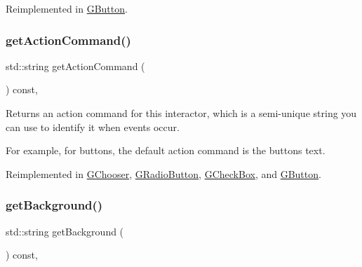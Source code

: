 Reimplemented in \mbox{\hyperlink{classGButton_a432ca43c59ffb2adc9cb66d43621bc27}{G\+Button}}.

\mbox{\label{classGInteractor_a94eb4276000c4fdfb508ce9e6317a82a}} 
\subsubsection{\texorpdfstring{get\+Action\+Command()}{getActionCommand()}}
{\footnotesize\ttfamily std\+::string get\+Action\+Command (\begin{DoxyParamCaption}{ }\end{DoxyParamCaption}) const\hspace{0.3cm}{\ttfamily [virtual]}, {\ttfamily [inherited]}}



Returns an action command for this interactor, which is a semi-\/unique string you can use to identify it when events occur. 

For example, for buttons, the default action command is the button\textquotesingle{}s text. 

Reimplemented in \mbox{\hyperlink{classGChooser_a90f2b1e6f6e7dabd9d6e5307f7c6d1b7}{G\+Chooser}}, \mbox{\hyperlink{classGRadioButton_a90f2b1e6f6e7dabd9d6e5307f7c6d1b7}{G\+Radio\+Button}}, \mbox{\hyperlink{classGCheckBox_a90f2b1e6f6e7dabd9d6e5307f7c6d1b7}{G\+Check\+Box}}, and \mbox{\hyperlink{classGButton_a90f2b1e6f6e7dabd9d6e5307f7c6d1b7}{G\+Button}}.

\mbox{\label{classGInteractor_a808e22cc1fdfbecf71ed8c64ef4600e0}} 
\subsubsection{\texorpdfstring{get\+Background()}{getBackground()}}
{\footnotesize\ttfamily std\+::string get\+Background (\begin{DoxyParamCaption}{ }\end{DoxyParamCaption}) const\hspace{0.3cm}{\ttfamily [virtual]}, {\ttfamily [inherited]}}



